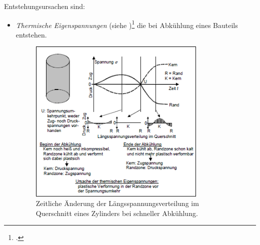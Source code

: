 \documentclass[12pt,a4paper,parskip]{scrartcl}
\begin{document}
{Entstehungsursachen sind:
\begin{itemize}
\item \emph{Thermische Eigenspannungen} (siehe )\footcite[34]{hu} die bei Abkühlung eines Bauteils entstehen.\begin{figure}
  \centering
  \includegraphics[width=0.8\textwidth] {eigenspanabk}
  \caption{Zeitliche Änderung der Längsspannungsverteilung im Querschnitt eines Zylinders bei schneller Abkühlung.}
  \label{fig:eigenspanabk}
  \end{figure}


\end{itemize}}
\end{document}
